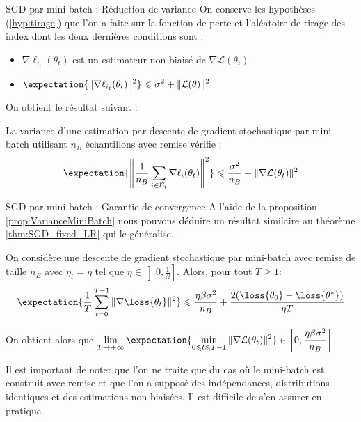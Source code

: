 \documentclass{beamer}
\begin{document}
\begin{frame}{}{SGD par mini-batch : Réduction de variance}
	On conserve les hypothèses (\ref{hyp:tirage}) que l'on a faite sur la fonction de perte et l'aléatoire de tirage des index dont les deux dernières conditions sont :
	
	\begin{itemize}
		\item $\displaystyle \nabla \ell_{i_t}(\theta_t)$ est un estimateur non biaisé de $\nabla \mathcal{L}(\theta_t)$
		\item $\displaystyle \expectation{\|\nabla \ell_{i_t}(\theta_t)\|^2} \leqslant \sigma^2 + \|\mathcal{L}(\theta)\|^2$\newline
	\end{itemize}
	
	On obtient le résultat suivant :\newline
	
	\begin{proposition}[Variance]
		La variance d'une estimation par descente de gradient stochastique par mini-batch utilisant $n_B$ échantillons avec remise vérifie :
		\begin{equation*}
			\expectation{\left\|\frac{1}{n_B} \sum_{i\in \mathcal{B}_t}\nabla \ell_i(\theta_t)\right\|^2} \leqslant \frac{\sigma^2}{n_B} + \|\nabla\mathcal{L}(\theta_t)\|^2
			\label{prop:VarianceMiniBatch}
		\end{equation*}
	\end{proposition}
\end{frame}




\begin{frame}{}{SGD par mini-batch : Garantie de convergence}
	A l'aide de la proposition \ref{prop:VarianceMiniBatch} nous pouvons déduire un résultat similaire au théorème \ref{thm:SGD_fixed_LR} qui le généralise.
	
	\begin{theoreme}
		On considère une descente de gradient stochastique par mini-batch avec remise de taille $n_B$ avec $\eta_t=\eta$ tel que $\displaystyle \eta\in \left]0, \frac{1}{\beta}\right]$. Alors, pour tout $T \geqslant 1$:
		\begin{equation*}
			\expectation{\frac{1}{T}\sum_{t=0}^{T-1}\|\nabla\loss{\theta_t}\|^2} \leqslant \frac{\eta\beta\sigma^2}{n_B} + \frac{2(\loss{\theta_0}-\loss{\theta^*})}{\eta T}
		\end{equation*}
		\label{thm:SGD_MiniBatch}
	\end{theoreme}
	
	On obtient alors que $\displaystyle \lim_{T\rightarrow+\infty}\expectation{\min_{0\leqslant t\leqslant T-1}\|\nabla \mathcal{L}(\theta_t)\|^2} \in \left[0, \frac{\eta\beta\sigma^2}{n_B}\right]$.\newline
	
	Il est important de noter que l'on ne traite que du cas où le mini-batch est construit avec remise et que l'on a supposé des indépendances, distributions identiques et des estimations non biaisées. Il est difficile de s'en assurer en pratique.
\end{frame}
\end{document}
